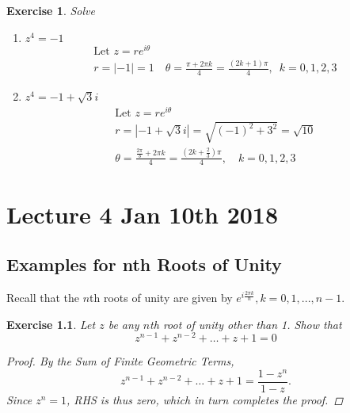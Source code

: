\documentclass[11pt, oneside]{book}
\theoremstyle{break}
\newtheorem*{proof}{Proof}
\newtheorem{ex}{Exercise}[section]
\newcommand{\abs}[1]{\left|#1\right|}						%
\begin{document}
\begin{ex}
	Solve
	\begin{enumerate}
		\item $z^4 = -1$
			\begin{gather*}
				\text{Let } z = re^{i \theta} \\
				r = \abs{-1} = 1 \quad \theta = \frac{\pi + 2 \pi k}{4} = \frac{(2k + 1) \pi}{4}, \enspace k = 0, 1, 2, 3
			\end{gather*}
		\item $z^4 = -1 + \sqrt{3} i$
			\begin{gather*}
				\text{Let } z = re^{i \theta} \\
				r = \abs{-1 + \sqrt{3} i} = \sqrt{(-1)^2 + 3^2} = \sqrt{10} \\
				\theta = \frac{\frac{2\pi}{3} + 2\pi k}{4} = \frac{(2k + \frac{2}{3}) \pi}{4}, \quad k = 0, 1, 2, 3  
			\end{gather*}
	\end{enumerate}
\end{ex}




\chapter{Lecture 4 Jan 10th 2018}
	\label{chapter:lecture_4_jan_10th_2018}

\section{Examples for nth Roots of Unity} %
\label{sec:examples_for_nth_roots_of_unity}

Recall that the $n$th roots of unity are given by $e^{i \frac{2\pi k}{n}}, k = 0, 1, ..., n - 1$.

\begin{ex}\label{ex:sum of root of unity other than one is negative one}
	Let $z$ be any $n$th root of unity other than 1. Show that
	\begin{equation}
		z^{n - 1} + z^{n - 2} + \hdots + z + 1 = 0
	\end{equation}

	\begin{proof}
		By the Sum of Finite Geometric Terms,
		\begin{equation*}
			z^{n - 1} + z^{n - 2} + \hdots + z + 1 = \frac{1 - z^n}{1 - z}.
		\end{equation*}
		Since $z^n = 1$, RHS is thus zero, which in turn completes the proof.
	\end{proof}
\end{ex}
\end{document}
